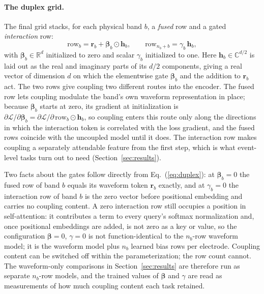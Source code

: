 \paragraph{The duplex grid.}
The final grid stacks, for each physical band $b$, a \emph{fused} row and
a gated \emph{interaction} row:
\begin{equation}
\text{row}_b = \mathbf{r}_b + \boldsymbol{\beta}_b \odot \mathbf{h}_b, \qquad
\text{row}_{n_b + b} = \gamma_b\, \mathbf{h}_b,
\label{eq:duplex}
\end{equation}
with $\boldsymbol{\beta}_b \in \mathbb{R}^d$ initialized to zero and scalar
$\gamma_b$ initialized to one. Here $\mathbf{h}_b \in \mathbb{C}^{d/2}$ is
laid out as the real and imaginary parts of its $d/2$ components, giving
a real vector of dimension $d$ on which the elementwise gate
$\boldsymbol{\beta}_b$ and the addition to $\mathbf{r}_b$ act. The two rows give coupling two different
routes into the encoder. The fused row lets coupling modulate the band's
own waveform representation in place; because $\boldsymbol{\beta}_b$
starts at zero, its gradient at initialization is
$\partial\mathcal{L}/\partial\boldsymbol{\beta}_b =
\partial\mathcal{L}/\partial\,\text{row}_b \odot \mathbf{h}_b$, so
coupling enters this route only along the directions in which the
interaction token is correlated with the loss gradient, and the fused rows
coincide with the uncoupled model until it does. The interaction row makes
coupling a separately attendable feature from the first step, which is what
event-level tasks turn out to need (Section~\ref{sec:results}).

Two facts about the gates follow directly from Eq.~(\ref{eq:duplex}):
at $\boldsymbol{\beta}_b = 0$ the fused row of band $b$ equals its waveform
token $\mathbf{r}_b$ exactly, and at $\gamma_b = 0$ the interaction row of
band $b$ is the zero vector before positional embedding and carries no
coupling content. A zero interaction row still occupies a
position in self-attention: it contributes a term to every query's
softmax normalization and, once positional embeddings are added, is not
zero as a key or value, so the configuration $\boldsymbol{\beta} = 0$,
$\gamma = 0$ is not function-identical to the $n_b$-row waveform model;
it is the waveform model plus $n_b$ learned bias rows per electrode.
Coupling content can be switched off within the parameterization; the
row count cannot. The waveform-only comparisons in
Section~\ref{sec:results} are therefore run as separate $n_b$-row models,
and the trained values of $\boldsymbol{\beta}$ and $\gamma$ are read as
measurements of how much coupling content each task retained.

